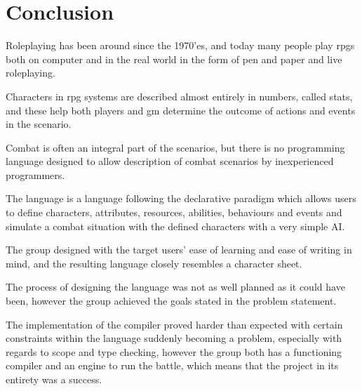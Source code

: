 \chapter{Conclusion}
Roleplaying has been around since the 1970'es, and today many people play \ac{rpgs} both on computer and in the real world in the form of pen and paper and live roleplaying.

Characters in \ac{rpg} systems are described almost entirely in numbers, called stats, and these help both players and \ac{gm} determine the outcome of actions and events in the scenario. 

Combat is often an integral part of the scenarios, but there is no programming language designed to allow description of combat scenarios by inexperienced programmers.

The language \langname{} is a language following the declarative paradigm which allows users to define characters, attributes, resources, abilities, behaviours and events and simulate a combat situation with the defined characters with a very simple AI.

The group designed \langname{} with the target users' ease of learning and ease of writing in mind, and the resulting language closely resembles a character sheet. 

The process of designing the language was not as well planned as it could have been, however the group achieved the goals stated in the problem statement.

The implementation of the compiler proved harder than expected with certain constraints within the language suddenly becoming a problem, especially with regards to scope and type checking, however the group both has a functioning compiler and an engine to run the battle, which means that the project in its entirety was a success.